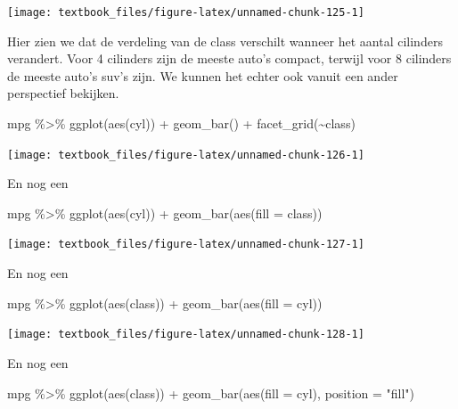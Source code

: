 \documentclass[]{tufte-book}
\newenvironment{Shaded}{}{}
\newcommand{\AttributeTok}[1]{\textcolor[rgb]{0.49,0.56,0.16}{#1}}
\newcommand{\FunctionTok}[1]{\textcolor[rgb]{0.02,0.16,0.49}{#1}}
\newcommand{\NormalTok}[1]{#1}
\newcommand{\SpecialCharTok}[1]{\textcolor[rgb]{0.25,0.44,0.63}{#1}}
\newcommand{\StringTok}[1]{\textcolor[rgb]{0.25,0.44,0.63}{#1}}
\begin{document}
\texttt{[image: textbook\_files/figure-latex/unnamed-chunk-125-1]}

Hier zien we dat de verdeling van de class verschilt wanneer het aantal cilinders verandert. Voor 4 cilinders zijn de meeste auto's compact, terwijl voor 8 cilinders de meeste auto's suv's zijn. We kunnen het echter ook vanuit een ander perspectief bekijken.

\begin{Shaded}
\begin{Highlighting}[]
\NormalTok{mpg }\SpecialCharTok{\%\textgreater{}\%}
  \FunctionTok{ggplot}\NormalTok{(}\FunctionTok{aes}\NormalTok{(cyl)) }\SpecialCharTok{+}
  \FunctionTok{geom\_bar}\NormalTok{() }\SpecialCharTok{+}
  \FunctionTok{facet\_grid}\NormalTok{(}\SpecialCharTok{\textasciitilde{}}\NormalTok{class)}
\end{Highlighting}
\end{Shaded}

\texttt{[image: textbook\_files/figure-latex/unnamed-chunk-126-1]}

En nog een

\begin{Shaded}
\begin{Highlighting}[]
\NormalTok{mpg }\SpecialCharTok{\%\textgreater{}\%}
  \FunctionTok{ggplot}\NormalTok{(}\FunctionTok{aes}\NormalTok{(cyl)) }\SpecialCharTok{+}
  \FunctionTok{geom\_bar}\NormalTok{(}\FunctionTok{aes}\NormalTok{(}\AttributeTok{fill =}\NormalTok{ class))}
\end{Highlighting}
\end{Shaded}

\texttt{[image: textbook\_files/figure-latex/unnamed-chunk-127-1]}

En nog een

\begin{Shaded}
\begin{Highlighting}[]
\NormalTok{mpg }\SpecialCharTok{\%\textgreater{}\%}
  \FunctionTok{ggplot}\NormalTok{(}\FunctionTok{aes}\NormalTok{(class)) }\SpecialCharTok{+}
  \FunctionTok{geom\_bar}\NormalTok{(}\FunctionTok{aes}\NormalTok{(}\AttributeTok{fill =}\NormalTok{ cyl))}
\end{Highlighting}
\end{Shaded}

\texttt{[image: textbook\_files/figure-latex/unnamed-chunk-128-1]}

En nog een

\begin{Shaded}
\begin{Highlighting}[]
\NormalTok{mpg }\SpecialCharTok{\%\textgreater{}\%}
  \FunctionTok{ggplot}\NormalTok{(}\FunctionTok{aes}\NormalTok{(class)) }\SpecialCharTok{+}
  \FunctionTok{geom\_bar}\NormalTok{(}\FunctionTok{aes}\NormalTok{(}\AttributeTok{fill =}\NormalTok{ cyl), }\AttributeTok{position =} \StringTok{"fill"}\NormalTok{)}
\end{Highlighting}
\end{Shaded}
\end{document}
